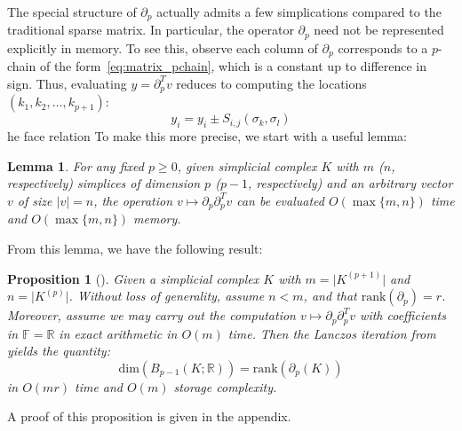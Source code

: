 \documentclass[10pt]{article}
\newcommand{\+}{%
	\raisebox{0.18ex}{\scaleobj{0.55}{+}}
}
\newtheorem{proposition}{Proposition}
\newtheorem{lemma}{Lemma}
\begin{document}
The special structure of $\partial_p$ actually admits a few simplications compared to the traditional sparse matrix. In particular, the operator $\partial_p$ need not be represented explicitly in memory. To see this, observe each column of $\partial_p$ corresponds to a $p$-chain of the form~\eqref{eq:matrix_pchain}, which is a constant up to difference in sign. Thus, evaluating $y = \partial_p^T v$ reduces to computing the locations $(k_1, k_2, \dots, k_{p+1})$:
\begin{equation}
	y_{i} = y_i \pm S_{i,j}(\sigma_k, \sigma_l)
\end{equation}
he face relation 
To make this more precise, we start with a useful lemma:
\begin{lemma}
For any fixed $p \geq 0$, given simplicial complex $K$ with $m$ ($n$, respectively) simplices of dimension $p$ ($p - 1$, respectively) and an arbitrary vector $v$ of size $\lvert v \rvert = n$, the operation $v \mapsto \partial_p \partial_p^T v$ can be evaluated $O(\max \{m,n\})$ time and $O(\max \{m,n\})$ memory. 
\end{lemma}
From this lemma, we have the following result: 
\begin{proposition}[\cite{parlett1994we, simon1984analysis}]\label{prop:exact_arith_matvec}
	Given a simplicial complex $K$ with $m = \lvert K^{(p+1)} \rvert$ and $n = \lvert K^{(p)} \rvert$. Without loss of generality, assume $n < m$, and that $\mathrm{rank}(\partial_p) = r$. 
	Moreover, assume we may carry out the computation $v \mapsto \partial_p \partial_p^T v$ with coefficients in $\mathbb{F} = \mathbb{R}$ in exact arithmetic in $O(m)$ time. 
	Then the Lanczos iteration from~\cite{} yields the quantity:
	\begin{equation}
		\mathrm{dim}(B_{p-1}(K; \mathbb{R})) = \mathrm{rank}(\partial_p(K))
	\end{equation}
	in $O(mr)$ time and $O(m)$ storage complexity. 
\end{proposition}
\noindent A proof of this proposition is given in the appendix. 
\end{document}
